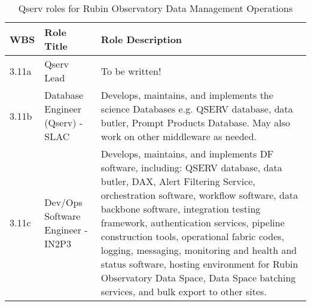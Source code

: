\normalsize \begin{longtable} {|p{}|p{}|p{}|} \caption{Qserv roles for Rubin Observatory Data Management Operations \label{tab:qsroles}}\\ 
\hline 
\textbf{WBS}&\textbf{Role Title}&\textbf{Role Description} \\ \hline
{3.11a}&{Qserv Lead}&{To be written!} \\ \hline
{3.11b}&{Database Engineer (Qserv) - SLAC}&{Develops, maintains, and implements the science Databases e.g. QSERV database, data butler, Prompt Products Database. May also work on other middleware as needed.} \\ \hline
{3.11c}&{Dev/Ops Software Engineer - IN2P3}&{Develops, maintains, and implements DF software, including: QSERV database, data butler, DAX, Alert Filtering Service, orchestration software, workflow software, data backbone software, integration testing framework, authentication services, pipeline construction tools, operational fabric codes, logging, messaging, monitoring and health and status software, hosting environment for Rubin Observatory Data Space, Data Space batching services, and bulk export to other sites.} \\ \hline
\end{longtable} \normalsize
